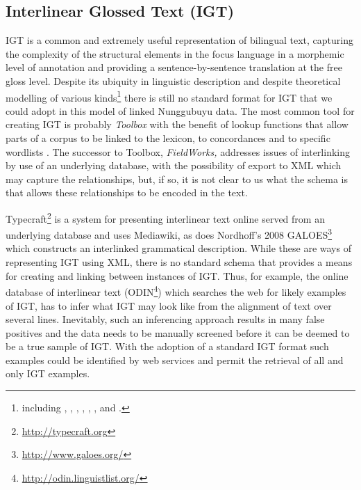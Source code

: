 \subsection{Interlinear Glossed Text (IGT)}\label{thie:sec:3-2}
IGT is a common and extremely useful representation of bilingual text, capturing the complexity of the structural elements in the focus language in a morphemic level of annotation and providing a sentence-by-sentence translation at the free gloss level. Despite its ubiquity in linguistic description and despite theoretical modelling of various kinds\footnote{including 
  \citet{BowEtAl2003}, 
  \citet{HughesEtAl2003},
  \citet{HellmuthEtAl2006},
  \citet{Schmidt2003},
  \citet{Jacobson2006}, 
  \citet{JacobsonEtAl2001}, and \citet{PalmerEtAl2007}.
}
there is still no standard format for IGT that we could adopt in this model of linked Nunggubuyu data. The most common tool for creating IGT is probably \textit{Toolbox} with the benefit of lookup functions that allow parts of a corpus to be linked to the lexicon, to concordances and to specific wordlists \citep[see e.g.,][]{Hirzel2001}. The successor to Toolbox, \textit{FieldWorks,} addresses issues of interlinking by use of an underlying database, with the possibility of export to XML which may capture the relationships, but, if so, it is not clear to us what the schema is that allows these relationships to be encoded in the text.

Typecraft\footnote{\url{http://typecraft.org}} 
is a system for presenting interlinear text online served from an underlying database and uses Mediawiki, as does  Nordhoff's 2008 GALOES\footnote{ \url{http://www.galoes.org/}} which constructs an interlinked grammatical description. While these are ways of representing IGT using XML, there is no standard schema that provides a means for creating and linking between instances of IGT. Thus, for example, the online database of interlinear text (ODIN\footnote{ \url{http://odin.linguistlist.org/}}) which searches the web for likely examples of IGT, has to infer what IGT may look like from the alignment of text over several lines. Inevitably, such an inferencing approach results in many false positives and the data needs to be manually screened before it can be deemed to be a true sample of IGT. With the adoption of a standard IGT format such examples could be identified by web services and permit the retrieval of all and only IGT examples. 

